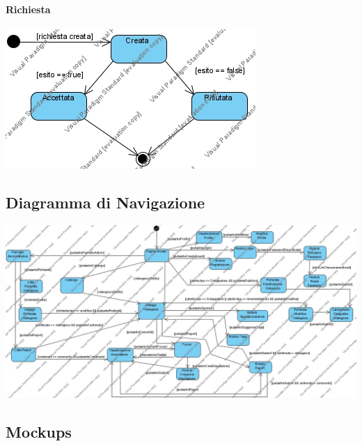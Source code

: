 \paragraph{Richiesta}
\begin{center}
\includegraphics[width=\textwidth,height=\textheight,keepaspectratio]{Figure/StateDiagrams/Richiesta.jpg}
\end{center}

\subsection{Diagramma di Navigazione}
\begin{center}
\includegraphics[width=\textwidth,height=\textheight,keepaspectratio]{Figure/NavigationalPath.jpg}
\end{center}

\newpage
\subsection{Mockups}
